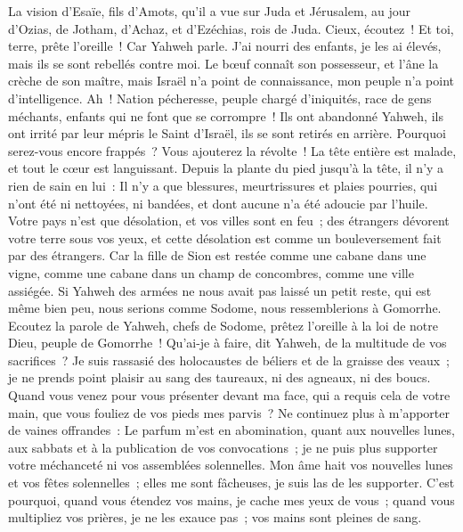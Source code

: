 \begin{multicols}{2}
\VerseOne{}La vision d'Esaïe, fils d'Amots, qu'il a vue sur Juda et Jérusalem, au jour d'Ozias, de Jotham, d'Achaz, et d'Ezéchias, rois de Juda.
Cieux, écoutez~! Et toi, terre, prête l'oreille~! Car Yahweh parle. J'ai nourri des enfants, je les ai élevés, mais ils se sont rebellés contre moi.
Le bœuf connaît son possesseur, et l'âne la crèche de son maître, mais Israël n'a point de connaissance, mon peuple n'a point d'intelligence.
Ah~! Nation pécheresse, peuple chargé d'iniquités, race de gens méchants, enfants qui ne font que se corrompre~! Ils ont abandonné Yahweh, ils ont irrité par leur mépris le Saint d'Israël, ils se sont retirés en arrière.
Pourquoi serez-vous encore frappés~? Vous ajouterez la révolte~! La tête entière est malade, et tout le cœur est languissant.
Depuis la plante du pied jusqu'à la tête, il n'y a rien de sain en lui~: Il n'y a que blessures, meurtrissures et plaies pourries, qui n'ont été ni nettoyées, ni bandées, et dont aucune n'a été adoucie par l'huile.
Votre pays n'est que désolation, et vos villes sont en feu~; des étrangers dévorent votre terre sous vos yeux, et cette désolation est comme un bouleversement fait par des étrangers.
Car la fille de Sion est restée comme une cabane dans une vigne, comme une cabane dans un champ de concombres, comme une ville assiégée.
Si Yahweh des armées ne nous avait pas laissé un petit reste, qui est même bien peu, nous serions comme Sodome, nous ressemblerions à Gomorrhe.
Ecoutez la parole de Yahweh, chefs de Sodome, prêtez l'oreille à la loi de notre Dieu, peuple de Gomorrhe~!
Qu'ai-je à faire, dit Yahweh, de la multitude de vos sacrifices~? Je suis rassasié des holocaustes de béliers et de la graisse des veaux~; je ne prends point plaisir au sang des taureaux, ni des agneaux, ni des boucs.
Quand vous venez pour vous présenter devant ma face, qui a requis cela de votre main, que vous fouliez de vos pieds mes parvis~?
Ne continuez plus à m'apporter de vaines offrandes~: Le parfum m'est en abomination, quant aux nouvelles lunes, aux sabbats et à la publication de vos convocations~; je ne puis plus supporter votre méchanceté ni vos assemblées solennelles.
Mon âme hait vos nouvelles lunes et vos fêtes solennelles~; elles me sont fâcheuses, je suis las de les supporter.
C'est pourquoi, quand vous étendez vos mains, je cache mes yeux de vous~; quand vous multipliez vos prières, je ne les exauce pas~; vos mains sont pleines de sang.

\end{multicols}
